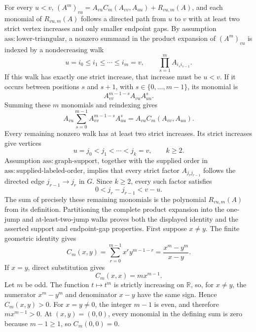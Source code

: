 For every \(u<v\), \((A^m)_{vu}=A_{vu}C_m(A_{vv},A_{uu})+R_{vu,m}(A)\), and each monomial of \(R_{vu,m}(A)\) follows a directed path from \(u\) to \(v\) with at least two strict vertex increases and only smaller endpoint gaps.
By assumption \(\mathrm{ass{:}lower\mbox{-}triangular}\), a nonzero summand in the product expansion of \((A^m)_{vu}\) is indexed by a nondecreasing walk
\[
 u=i_0\le i_1\le\cdots\le i_m=v,
 \qquad
 \prod_{s=1}^{m}A_{i_s i_{s-1}}.
\]
If this walk has exactly one strict increase, that increase must be \(u<v\).  If it occurs between positions \(s\) and \(s+1\), with \(s\in\{0,\ldots,m-1\}\), its monomial is
\[
 A_{vv}^{m-1-s}A_{vu}A_{uu}^{s}.
\]
Summing these \(m\) monomials and reindexing gives
\[
 A_{vu}\sum_{s=0}^{m-1}A_{vv}^{m-1-s}A_{uu}^{s}
 =A_{vu}C_m(A_{vv},A_{uu}).
\]
Every remaining nonzero walk has at least two strict increases.  Its strict increases give vertices
\[
 u=j_0<j_1<\cdots<j_k=v,
 \qquad k\ge2.
\]
Assumption \(\mathrm{ass{:}graph\mbox{-}support}\), together with the supplied order in \(\mathrm{ass{:}supplied\mbox{-}labeled\mbox{-}order}\), implies that every strict factor \(A_{j_rj_{r-1}}\) follows the directed edge \(j_{r-1}\to j_r\) in \(G\).  Since \(k\ge2\), every such factor satisfies
\[
 0<j_r-j_{r-1}<v-u.
\]
The sum of precisely these remaining monomials is the polynomial \(R_{vu,m}(A)\) from its definition.  Partitioning the complete product expansion into the one-jump and at-least-two-jump walks proves both the displayed identity and the asserted support and endpoint-gap properties.
First suppose \(x\ne y\).  The finite geometric identity gives
\[
 C_m(x,y)=\sum_{r=0}^{m-1}x^r y^{m-1-r}
 =\frac{x^m-y^m}{x-y}.
\]
If \(x=y\), direct substitution gives
\[
 C_m(x,x)=m x^{m-1}.
\]
Let \(m\) be odd.  The function \(t\mapsto t^m\) is strictly increasing on \(\mathbb R\), so, for \(x\ne y\), the numerator \(x^m-y^m\) and denominator \(x-y\) have the same sign.  Hence \(C_m(x,y)>0\).  For \(x=y\ne0\), the integer \(m-1\) is even, and therefore \(m x^{m-1}>0\).  At \((x,y)=(0,0)\), every monomial in the defining sum is zero because \(m-1\ge1\), so \(C_m(0,0)=0\).

